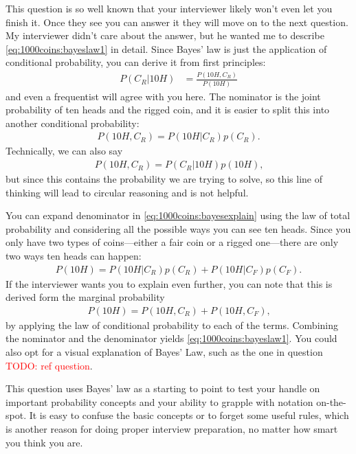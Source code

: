 \documentclass[11pt]{article}
\begin{document}
This question is so well known that your interviewer likely won't even let you finish it.
Once they see you can answer it they will move on to the next question.
My interviewer didn't care about the answer, but he wanted me to describe \eqref{eq:1000coins:bayeslaw1} in detail.
Since Bayes' law is just the application of conditional probability, you can derive it from first principles:
\begin{align}
\label{eq:1000coins:bayesexplain}
 P( C_{R} \vert 10H)
 &=
 \frac{
    P( 10H , C_{R} )
 }{
    P( 10H )
 }
\end{align}
and even a frequentist will agree with you here.
The nominator is the joint probability of ten heads and the rigged coin, and it is easier to split this into another conditional probability:
\begin{align*}
    P( 10H , C_{R} )
    =
    P( 10H \vert C_{R} ) p( C_{R} )
    \text{.}
\end{align*}
Technically, we can also say
\begin{align*}
    P( 10H , C_{R} )
    =
    P( C_{R} \vert 10H  ) p( 10H  )
    \text{,}
\end{align*}
but since this contains the probability we are trying to solve, so this line of thinking will lead to circular reasoning and is not helpful.

You can expand denominator in
\eqref{eq:1000coins:bayesexplain}
using the law of total probability and considering all the possible ways you can see ten heads.
Since you only have two types of coins---either a fair coin or a rigged one---there are only two ways ten heads can happen:
\begin{align*}
    P( 10H ) =
    P( 10H \vert C_{R} )p(C_{R})
    +
    P( 10H \vert C_{F} )p(C_{F})
    \text{.}
\end{align*}
If the interviewer wants you to explain even further, you can note that this is derived form the marginal probability
\begin{align*}
    P( 10H ) =
    P( 10H , C_{R} )
    +
    P( 10H , C_{F} )
    \text{,}
\end{align*}
by applying the law of conditional probability to each of the terms.
Combining the nominator and the denominator yields \eqref{eq:1000coins:bayeslaw1}.
You could also opt for a visual explanation of Bayes' Law, such as the one in question \textcolor{red} {TODO: ref question}.

This question uses Bayes' law as a starting to point to test your handle on important probability concepts and your ability to grapple with notation on-the-spot.
It is easy to confuse the basic concepts or to forget some useful rules, which is another reason for doing proper interview preparation, no matter how smart you think you are.





%
%
\end{document}
